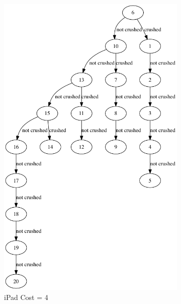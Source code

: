 \documentclass[12pt,a4paper,oneside]{report}
\begin{document}
\begin{figure}[H]
\begin{subfigure}{0.3\textwidth}
		\includegraphics[width=\textwidth]{fixed_cost_4}
		\caption{iPad Cost = 4}
		\label{fig:fixed_cost_4}
	\end{subfigure}
	\begin{subfigure}{0.3\textwidth}

\end{subfigure}
\end{figure}
\end{document}
